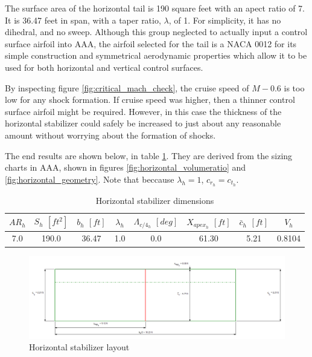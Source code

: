 \documentclass[conf]{new-aiaa}
\begin{document}
The surface area of the horizontal tail is 190 square feet with an apect 
ratio of 7. It is 36.47 feet in span, with a taper ratio, $\lambda$, of 1. 
For simplicity, it has no dihedral, and no sweep. Although this group 
neglected to actually input a control surface airfoil into AAA, the airfoil 
selected for the tail is a NACA 0012 for its simple construction and 
symmetrical aerodynamic properties which allow it to be used for both 
horizontal and vertical control surfaces.

By inspecting figure \ref{fig:critical_mach_check}, the cruise speed of 
$M-0.6$ is too low for any shock formation. If cruise speed was higher, 
then a thinner control surface airfoil might be required. However, in this 
case the thickness of the horizontal stabilizer could safely be increased to 
just about any reasonable amount without worrying about the formation of shocks.

The end results are shown below, in table 
\ref{tab:horizontal_stabilizer_size}. They are derived from the sizing 
charts in AAA, shown in figures \ref{fig:horizontal_volumeratio} and 
\ref{fig:horizontal_geometry}. Note that beccause $\lambda_h = 1$,
$c_{r_h} = c_{t_h}$.

\begin{table}[H]
\centering
\caption{Horizontal stabilizer dimensions}
\begin{tabular}{|c|c|c|c|c|c|c|c|}\hline
    $AR_h$ & $S_h$ $[ft^2]$ & $b_h$ $[ft]$ & $\lambda_h$ & $\Lambda_{c/4_h}$ $[deg]$ & $X_{apex_h}$ $[ft]$ & $\bar{c}_h$ $[ft]$ & $V_h$  \\ \hline
    7.0 & 190.0 & 36.47 & 1.0 & 0.0 & 61.30 & 5.21 & 0.8104 \\ \hline
\end{tabular}
\label{tab:horizontal_stabilizer_size}
\end{table}

\begin{figure}[H]
    \includegraphics[width=\textwidth]{Report3Printouts/Empannage/Horizontal_geometry_plot.png}
    \caption{Horizontal stabilizer layout}
    \label{fig:horizontal_geometry_plot}
\end{figure}
\end{document}
